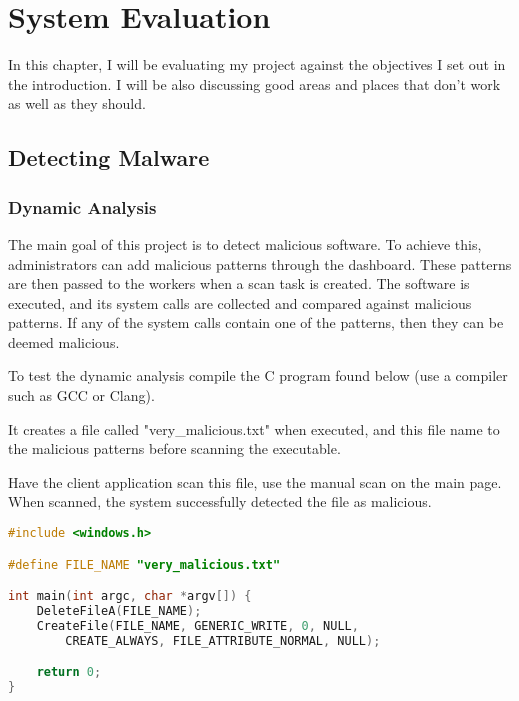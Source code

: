 \chapter{System Evaluation}

In this chapter, I will be evaluating my project against the
objectives I set out in the introduction.
I will be also discussing good areas and places that don't work as well as they should.

\section{Detecting Malware}
\subsection{Dynamic Analysis}
The main goal of this project is to detect malicious software.
To achieve this, administrators can add malicious patterns through the dashboard.
These patterns are then passed to the workers when a scan task is created.
The software is executed, and its system calls are collected
and compared against malicious patterns.
If any of the system calls contain one of the patterns,
then they can be deemed malicious.

To test the dynamic analysis compile the C program found below
(use a compiler such as GCC or Clang).

It creates a file called "very\_malicious.txt" when executed,
and this file name to the malicious patterns before scanning the executable.

Have the client application scan this file,
use the manual scan on the main page.
When scanned, the system successfully detected the file as malicious.

\begin{lstlisting}[language=C]
#include <windows.h>

#define FILE_NAME "very_malicious.txt"

int main(int argc, char *argv[]) {
    DeleteFileA(FILE_NAME);
    CreateFile(FILE_NAME, GENERIC_WRITE, 0, NULL,
        CREATE_ALWAYS, FILE_ATTRIBUTE_NORMAL, NULL);

    return 0;
}
\end{lstlisting}

